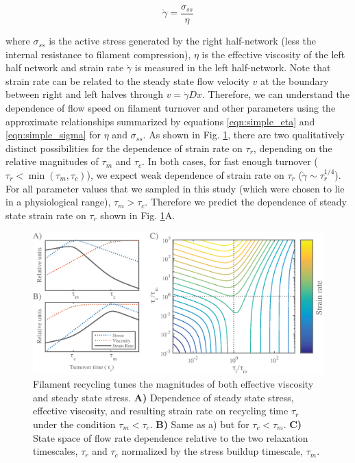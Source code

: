 \begin{equation}
	\label{eqn:everybody_knows}
	\dot{\gamma} = \frac{\sigma_{ss}}{\eta}  
\end{equation}


where $\sigma_{ss}$ is the active stress generated by the right half-network (less the internal resistance to filament compression), $\eta$ is the effective viscosity of the left half network and strain rate $\dot{\gamma}$ is measured in the left half-network.  Note that strain rate can be related to the steady state flow velocity $v$ at the boundary between right and left halves through $ v = \dot{\gamma}Dx$. Therefore, we can understand the dependence of flow speed on filament turnover and other parameters using the approximate relationships summarized by equations \ref{eqn:simple_eta} and \ref{eqn:simple_sigma} for $\eta$ and $\sigma_{ss}$.  As shown in Fig. \ref{fig:flow_theo}, there are two qualitatively distinct possibilities for the dependence of strain rate on $\tau_r$, depending on the relative magnitudes of $\tau_m$ and $\tau_c$.  In both cases, for fast enough turnover ($\tau_r < \min \left (\tau_m, \tau_c \right )$), we expect weak dependence of strain rate on $\tau_r$ ($ \dot{\gamma}\sim \tau_r^{1/4}$).  For all parameter values that we sampled in this study (which were chosen to lie in a physiological range), $\tau_m > \tau_c$. Therefore we predict the dependence of steady state strain rate on $\tau_r$ shown in Fig. \ref{fig:flow_theo}A.


\begin{figure}[H]
	\centering
	\includegraphics[width=\hsize]{active/figures/Fig8}
	\caption{\label{fig:flow_theo}  Filament recycling tunes the magnitudes of both effective viscosity and steady state stress. \textbf{A)}  Dependence of steady state stress, effective viscosity, and resulting strain rate on recycling time $\tau_r$ under the condition $\tau_{m}<\tau_c$. \textbf{B)} Same as a) but for $\tau_c<\tau_{m}$.  \textbf{C)} State space of flow rate dependence relative to the two relaxation timescales, $\tau_r$ and $\tau_c$ normalized by the stress buildup timescale, $\tau_{m}$.  }
\end{figure}

